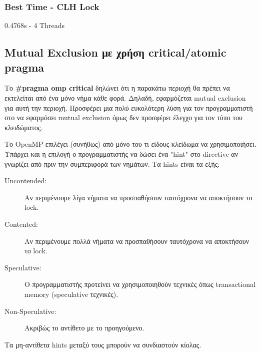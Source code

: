 \documentclass[../final_report.tex]{subfiles}
\begin{document}
\subsubsection*{Best Time - CLH Lock}
0.4768s - 4 Threads

\subsection{Mutual Exclusion με χρήση critical/atomic pragma}

Το \textbf{\#pragma omp critical} δηλώνει ότι η παρακάτω περιοχή θα πρέπει να εκτελείται από ένα μόνο νήμα κάθε φορά. Δηλαδή,
εφαρμόζεται mutual exclusion για αυτή την περιοχή. Προσφέρει μια πολύ ευκολότερη λύση για τον προγραμματιστή στο να εφαρμόσει
mutual exclusion όμως δεν προσφέρει έλεγχο για τον τύπο του κλειδώματος.

Το OpenMP επιλέγει (συνήθως) από μόνο του τι είδους κλείδωμα να χρησιμοποιήσει. Υπάρχει και η επιλογή ο προγραμματιστής
να δώσει ένα "hint" στο directive αν γνωρίζει από πριν την συμπεριφορά των νημάτων. Τα hints είναι τα εξής:

\begin{description}
    \item [Uncontended:] Αν περιμένουμε λίγα νήματα να προσπαθήσουν ταυτόχρονα να αποκτήσουν το lock.
    \item [Contented:] Αν περιμένουμε πολλά νήματα να προσπαθήσουν ταυτόχρονα να αποκτήσουν το lock.
    \item [Speculative:] Ο προγραμματιστής προτείνει να χρησιμοποιηθούν τεχνικές όπως transactional memory (speculative τεχνικές).
    \item [Non-Speculative:] Ακριβώς το αντίθετο με το προηγούμενο.
\end{description}

Τα μη-αντίθετα hints μεταξύ τους μπορούν να συνδιαστούν κίολας.
\end{document}
